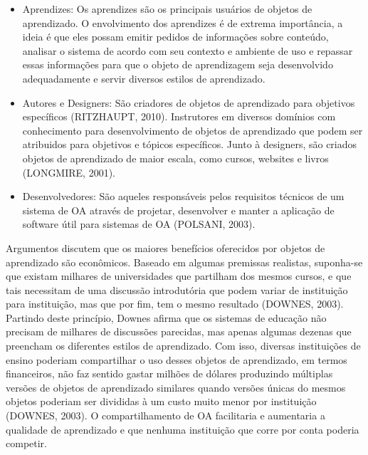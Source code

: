 \documentclass[12pt,openright,oneside,a4paper,english,french,spanish,brazil]{unifil}
\begin{document}
\begin{itemize}
\item Aprendizes: Os aprendizes são os principais usuários de objetos de aprendizado. O envolvimento dos aprendizes é de extrema importância, a ideia é que eles possam emitir pedidos de informações sobre conteúdo, analisar o sistema de acordo com seu contexto e ambiente de uso e repassar essas informações para que o objeto de aprendizagem seja desenvolvido adequadamente e servir diversos estilos de aprendizado.
\item Autores e Designers: São criadores de objetos de aprendizado para objetivos específicos (\uppercase{Ritzhaupt}, 2010). Instrutores em diversos domínios com conhecimento para desenvolvimento de objetos de aprendizado que podem ser atribuidos para objetivos e tópicos específicos. Junto à designers, são criados objetos de aprendizado de maior escala, como cursos, websites e livros (\uppercase{Longmire}, 2001).
\item Desenvolvedores: São aqueles responsáveis pelos requisitos técnicos de um sistema de OA através de projetar, desenvolver e manter a aplicação de software útil para sistemas de OA (\uppercase{Polsani}, 2003).
\end{itemize}

Argumentos discutem que os maiores benefícios oferecidos por objetos de aprendizado são econômicos. Baseado em algumas premissas realistas, suponha-se que existam milhares de universidades que partilham dos mesmos cursos, e que tais necessitam de uma discussão introdutória que podem variar de instituição para instituição, mas que por fim, tem o mesmo resultado (\uppercase{Downes}, 2003). Partindo deste princípio, Downes afirma que os sistemas de educação não precisam de milhares de discussões parecidas, mas apenas algumas dezenas que preencham os diferentes estilos de aprendizado. Com isso, diversas instituições de ensino poderiam compartilhar o uso desses objetos de aprendizado, em termos financeiros, não faz sentido gastar milhões de dólares produzindo múltiplas versões de objetos de aprendizado similares quando versões únicas do mesmos objetos poderiam ser divididas à um custo muito menor por instituição (\uppercase{Downes}, 2003). O compartilhamento de OA facilitaria e aumentaria a qualidade de aprendizado e que nenhuma instituição que corre por conta poderia competir.
\end{document}
